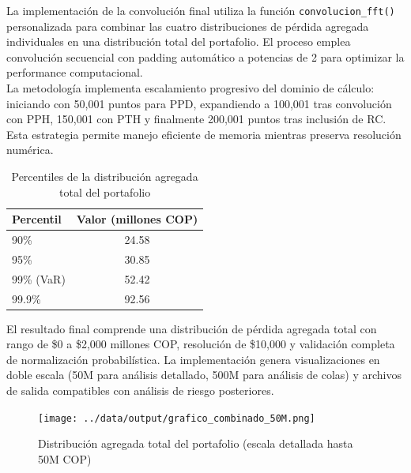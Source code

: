 La implementación de la convolución final utiliza la función \texttt{convolucion\_fft()} personalizada para combinar las cuatro distribuciones de pérdida agregada individuales en una distribución total del portafolio. El proceso emplea convolución secuencial con padding automático a potencias de 2 para optimizar la performance computacional.\\

La metodología implementa escalamiento progresivo del dominio de cálculo: iniciando con 50,001 puntos para PPD, expandiendo a 100,001 tras convolución con PPH, 150,001 con PTH y finalmente 200,001 puntos tras inclusión de RC. Esta estrategia permite manejo eficiente de memoria mientras preserva resolución numérica.

\begin{table}[H]
\centering
\caption{Percentiles de la distribución agregada total del portafolio}
\begin{tabular}{lc}
\hline
\textbf{Percentil} & \textbf{Valor (millones COP)} \\
\hline
90\% & 24.58 \\
95\% & 30.85 \\
99\% (VaR) & 52.42 \\
99.9\% & 92.56 \\
\hline
\end{tabular}
\end{table}

El resultado final comprende una distribución de pérdida agregada total con rango de \$0 a \$2,000 millones COP, resolución de \$10,000 y validación completa de normalización probabilística. La implementación genera visualizaciones en doble escala (50M para análisis detallado, 500M para análisis de colas) y archivos de salida compatibles con análisis de riesgo posteriores.

\begin{figure}[H]
\centering
\texttt{[image: ../data/output/grafico\_combinado\_50M.png]}
\caption{Distribución agregada total del portafolio (escala detallada hasta 50M COP)}
\end{figure}